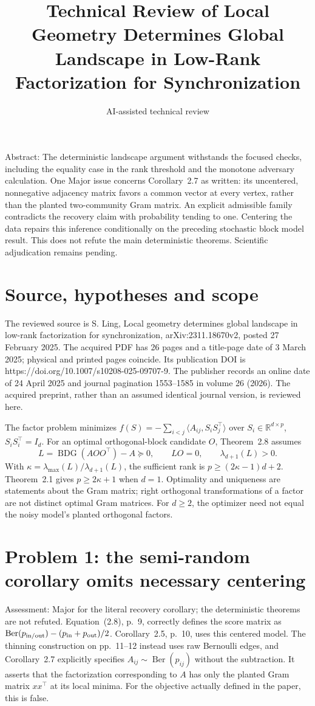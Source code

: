 \documentclass[10pt]{article}
\title{Technical Review of Local Geometry Determines
Global Landscape in Low-Rank Factorization
for Synchronization}
\author{AI-assisted technical review}
\date{}
\begin{document}
\maketitle
Abstract: The deterministic landscape argument withstands the focused checks, including the equality case in the rank threshold and the monotone adversary calculation. One Major issue concerns Corollary 2.7 as written: its uncentered, nonnegative adjacency matrix favors a common vector at every vertex, rather than the planted two-community Gram matrix. An explicit admissible family contradicts the recovery claim with probability tending to one. Centering the data repairs this inference conditionally on the preceding stochastic block model result. This does not refute the main deterministic theorems. Scientific adjudication remains pending.\par
\section*{Source, hypotheses and scope}
The reviewed source is S. Ling, Local geometry determines global landscape in low-rank factorization for synchronization, arXiv:2311.18670v2, posted 27 February 2025. The acquired PDF has 26 pages and a title-page date of 3 March 2025; physical and printed pages coincide. Its publication DOI is https://doi.org/10.1007/s10208-025-09707-9. The publisher records an online date of 24 April 2025 and journal pagination 1553–1585 in volume 26 (2026). The acquired preprint, rather than an assumed identical journal version, is reviewed here.\par
The factor problem minimizes \(f(S)=-\sum_{i<j}\langle A_{ij},S_iS_j^\top\rangle\) over \(S_i\in\mathbb R^{d\times p}\), \(S_iS_i^\top=I_d\). For an optimal orthogonal-block candidate \(O\), Theorem 2.8 assumes \[L=\operatorname{BDG}(AOO^\top)-A\succeq0,\qquad LO=0,\qquad
 \lambda_{d+1}(L)>0.\] With \(\kappa=\lambda_{\max}(L)/\lambda_{d+1}(L)\), the sufficient rank is \(p\ge(2\kappa-1)d+2\). Theorem 2.1 gives \(p\ge2\kappa+1\) when \(d=1\). Optimality and uniqueness are statements about the Gram matrix; right orthogonal transformations of a factor are not distinct optimal Gram matrices. For \(d\ge2\), the optimizer need not equal the noisy model’s planted orthogonal factors.\par
\section*{Problem 1: the semi-random corollary omits necessary centering}
Assessment: Major for the literal recovery corollary; the deterministic theorems are not refuted. Equation (2.8), p. 9, correctly defines the score matrix as \(\operatorname{Ber}(p_{\rm in/out})-(p_{\rm in}+p_{\rm out})/2\). Corollary 2.5, p. 10, uses this centered model. The thinning construction on pp. 11–12 instead uses raw Bernoulli edges, and Corollary 2.7 explicitly specifies \(A_{ij}\sim\operatorname{Ber}(p_{ij})\) without the subtraction. It asserts that the factorization corresponding to \(A\) has only the planted Gram matrix \(xx^\top\) at its local minima. For the objective actually defined in the paper, this is false.\par
\end{document}
